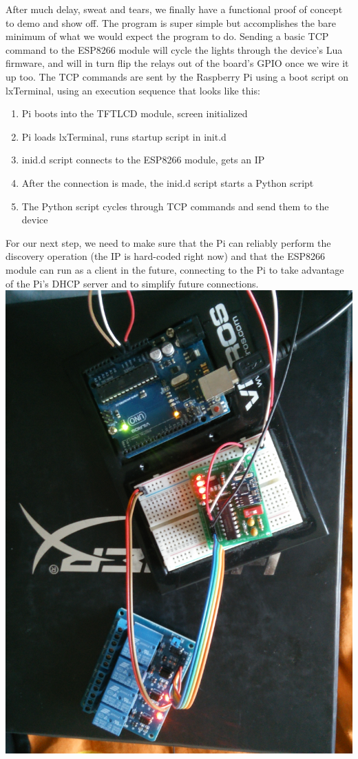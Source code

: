 \documentclass[letterpaper,10pt]{article}
\begin{document}
After much delay, sweat and tears, we finally have a functional proof 
of concept to demo and show off. The program is super simple but 
accomplishes the bare minimum of what we would expect the program to do.
Sending a basic TCP command to the ESP8266 module will cycle the lights 
through the device's Lua firmware, and will in turn flip the relays out of
the board's GPIO once we wire it up too. The TCP commands are sent by the 
Raspberry Pi using a boot script on lxTerminal, using an execution sequence
that looks like this:
\begin{enumerate}
\item{Pi boots into the TFTLCD module, screen initialized}
\item{Pi loads lxTerminal, runs startup script in init.d}
\item{inid.d script connects to the ESP8266 module, gets an IP}
\item{After the connection is made, the inid.d script starts a Python script}
\item{The Python script cycles through TCP commands and send them to the device}
\end{enumerate}

For our next step, we need to make sure that the Pi can reliably perform
the discovery operation (the IP is hard-coded right now) and that the ESP8266
module can run as a client in the future, connecting to the Pi to take 
advantage of the Pi's DHCP server and to simplify future connections.\\

\includegraphics[scale=0.1]{circuit.jpg}
\end{document}
